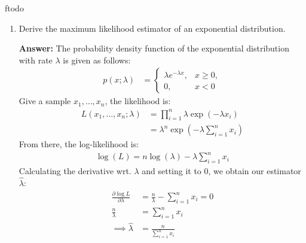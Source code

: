ƒtodo\documentclass{article}
\newenvironment{QandA}{\begin{enumerate}[label=\arabic*.]}{\end{enumerate}}
\newenvironment{answer}{\par\normalfont \textbf{Answer:}}{}
\begin{document}
\begin{QandA}
    \item Derive the maximum likelihood estimator of an exponential distribution.
    \begin{answer}
        The probability density function of the exponential distribution with rate $\lambda$ is given as follows:
        \begin{align*}
            p(x; \lambda) &= \begin{cases}
                \lambda e^{-\lambda x}, & x \ge 0, \\
                0, & x < 0
            \end{cases}
        \end{align*}
    \end{answer}
    Give a sample $x_1, \ldots, x_n$, the likelihood is:
    \begin{align*}
        L(x_1, \ldots, x_n; \lambda) &= \prod_{i=1}^n \lambda \exp(-\lambda x_i) \\
        &= \lambda^n \exp \left( -\lambda \sum_{i=1}^n x_i \right)
    \end{align*}
    From there, the log-likelihood is:
    \begin{align*}
        \log (L) = n \log (\lambda) - \lambda \sum_{i=1}^n x_i
    \end{align*}
    Calculating the derivative wrt. $\lambda$ and setting it to $0$, we obtain our estimator $\hat{\lambda}$:
    \begin{align*}
        \frac{\partial \log L}{\partial \lambda} &= \frac{n}{\lambda} - \sum_{i=1}^n x_i = 0 \\
        \frac{n}{\lambda} &= \sum_{i=1}^n x_i \\
        \implies \hat{\lambda} &= \frac{n}{\sum_{i=1}^n x_i}
    \end{align*}
\end{QandA}
\end{document}
